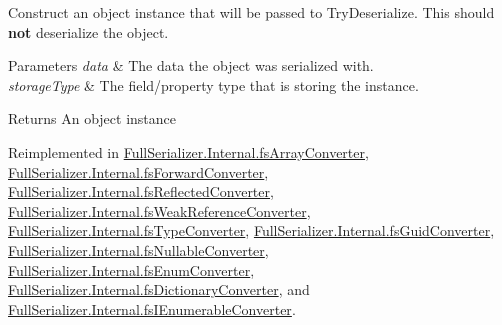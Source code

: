 Construct an object instance that will be passed to Try\+Deserialize. This should {\bfseries not} deserialize the object. 


\begin{DoxyParams}{Parameters}
{\em data} & The data the object was serialized with.\\
\hline
{\em storage\+Type} & The field/property type that is storing the instance.\\
\hline
\end{DoxyParams}
\begin{DoxyReturn}{Returns}
An object instance
\end{DoxyReturn}


Reimplemented in \hyperlink{class_full_serializer_1_1_internal_1_1fs_array_converter_a03e9dd52440176acd87f3047ababe392}{Full\+Serializer.\+Internal.\+fs\+Array\+Converter}, \hyperlink{class_full_serializer_1_1_internal_1_1fs_forward_converter_ac060a50ae6f3241ea0f9465e1d261d12}{Full\+Serializer.\+Internal.\+fs\+Forward\+Converter}, \hyperlink{class_full_serializer_1_1_internal_1_1fs_reflected_converter_ad5d48348410d9fc61794476ee9b282d6}{Full\+Serializer.\+Internal.\+fs\+Reflected\+Converter}, \hyperlink{class_full_serializer_1_1_internal_1_1fs_weak_reference_converter_a8732fca2359367dbf78c687898625406}{Full\+Serializer.\+Internal.\+fs\+Weak\+Reference\+Converter}, \hyperlink{class_full_serializer_1_1_internal_1_1fs_type_converter_af2049f4529f9138347b63bee54aa7397}{Full\+Serializer.\+Internal.\+fs\+Type\+Converter}, \hyperlink{class_full_serializer_1_1_internal_1_1fs_guid_converter_a86f7beefe9d841a8f3235a805ec43691}{Full\+Serializer.\+Internal.\+fs\+Guid\+Converter}, \hyperlink{class_full_serializer_1_1_internal_1_1fs_nullable_converter_ab47b05197a1f68036cecb45318b49233}{Full\+Serializer.\+Internal.\+fs\+Nullable\+Converter}, \hyperlink{class_full_serializer_1_1_internal_1_1fs_enum_converter_a1d20e736fc995f6d127a312ae19f55b2}{Full\+Serializer.\+Internal.\+fs\+Enum\+Converter}, \hyperlink{class_full_serializer_1_1_internal_1_1fs_dictionary_converter_aa35564498ee62b6d5e072e845ef0d8f6}{Full\+Serializer.\+Internal.\+fs\+Dictionary\+Converter}, and \hyperlink{class_full_serializer_1_1_internal_1_1fs_i_enumerable_converter_a787950b2cb51b536dc9fc01f5870f0d9}{Full\+Serializer.\+Internal.\+fs\+I\+Enumerable\+Converter}.

\mbox{\label{class_full_serializer_1_1fs_base_converter_a6df76d1eac0b4a6577845b4c9ddaa79d}} 
